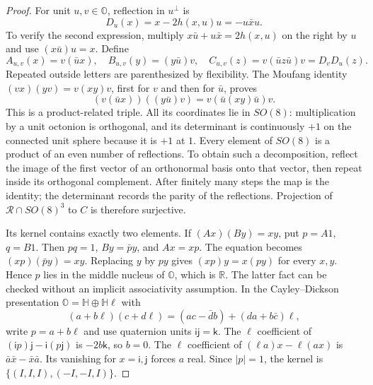 \begin{proof}
For unit $u,v\in\mathbb O$, reflection in $u^\perp$ is
\[
 D_u(x)=x-2h(x,u)u=-u\bar x u.
\]
To verify the second expression, multiply
$x\bar u+u\bar x=2h(x,u)$ on the right by $u$ and use
$(x\bar u)u=x$. Define
\[
 A_{u,v}(x)=v(\bar u x),\quad
 B_{u,v}(y)=(y\bar u)v,\quad
 C_{u,v}(z)=v(\bar u z\bar u)v=D_vD_u(z).
\]
Repeated outside letters are parenthesized by flexibility. The
Moufang identity $(vx)(yv)=v(xy)v$, first for $v$ and then for $\bar u$,
proves
\[
 (v(\bar u x))((y\bar u)v)=v(\bar u(xy)\bar u)v.
\]
This is a product-related triple. All its coordinates lie in $SO(8)$:
multiplication by a unit octonion is orthogonal, and its determinant
is continuously $+1$ on the connected unit sphere because it is $+1$
at $1$. Every element of $SO(8)$ is a product of an even number of
reflections. To obtain such a decomposition, reflect the image of the
first vector of an orthonormal basis onto that vector, then repeat
inside its orthogonal complement. After finitely many steps the map is
the identity; the determinant records the parity of the reflections.
Projection of $\mathcal R\cap SO(8)^3$ to $C$ is therefore surjective.

Its kernel contains exactly two elements. If $(Ax)(By)=xy$, put
$p=A1$, $q=B1$. Then $pq=1$, $By=\bar p y$, and $Ax=xp$.
The equation becomes $(xp)(\bar p y)=xy$. Replacing $y$ by $py$
gives $(xp)y=x(py)$ for every $x,y$. Hence $p$ lies in the middle
nucleus of $\mathbb O$, which is $\mathbb R$. The latter fact can be
checked without an implicit associativity assumption. In the
Cayley--Dickson presentation $\mathbb O=\mathbb H\oplus\mathbb H\ell$
with
\[
 (a+b\ell)(c+d\ell)=(ac-\bar d b)+(da+b\bar c)\ell,
\]
write $p=a+b\ell$ and use quaternion units
$\mathsf i\mathsf j=\mathsf k$. The $\ell$ coefficient of
$(\mathsf i p)\mathsf j-\mathsf i(p\mathsf j)$ is $-2b\mathsf k$,
so $b=0$. The $\ell$ coefficient of
$(\ell a)x-\ell(ax)$ is $\bar a\bar x-\bar x\bar a$.
Its vanishing for $x=\mathsf i,\mathsf j$ forces $a$ real.
Since $|p|=1$, the kernel is
$\{(I,I,I),(-I,-I,I)\}$.


\end{proof}
